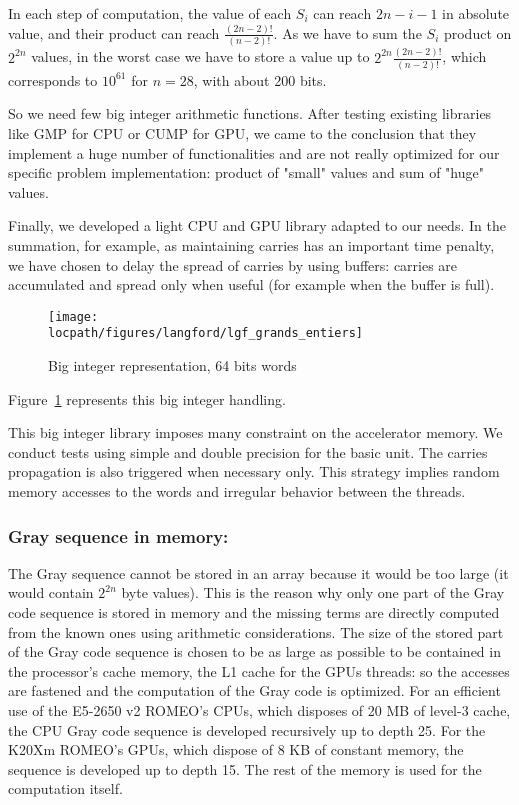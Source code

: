 In each step of computation, the value of each $S_i$ can reach $2n-i-1$ in absolute value, and their product can reach $\frac{(2n-2)!}{(n-2)!}$. 
As we have to sum the $S_i$ product on $2^{2n}$ values, in the worst case we have to store a value up to $2^{2n}\frac{(2n-2)!}{(n-2)!}$, which corresponds to $10^{61}$ for $n=28$, with about 200 bits.

So we need few big integer arithmetic functions. After testing existing libraries like GMP for CPU or CUMP for GPU, we came to the conclusion that they implement a huge number of functionalities and are not really optimized for our specific problem implementation: product of "small" values and sum of "huge" values. 

Finally, we developed a light CPU and GPU library adapted to our needs.
In the summation, for example, as maintaining carries has an important time penalty, we have chosen to delay the spread of carries by using buffers: carries are accumulated and spread only when useful (for example when the buffer is full).
\begin{figure}[t!]
\centering
\texttt{[image: \\locpath/figures/langford/lgf\_grands\_entiers]}
\caption{Big integer representation, 64 bits words}
\label{fig:big-integer}
\end{figure}
Figure~\ref{fig:big-integer} represents this big integer handling.

This big integer library imposes many constraint on the accelerator memory. 
We conduct tests using simple and double precision for the basic unit. 
The carries propagation is also triggered when necessary only. 
This strategy implies random memory accesses to the words and irregular behavior between the threads. 

\subsubsection{Gray sequence in memory: }
The Gray sequence cannot be stored in an array because it would be too large (it would contain $2^{2n}$ byte values). This is the reason why only one part of the Gray code sequence is stored in memory and the missing terms are directly computed from the known ones using arithmetic considerations.
The size of the stored part of the Gray code sequence is chosen to be as large as possible to be contained in the processor's cache memory, the L1 cache for the GPUs threads: so the accesses are fastened and the computation of the Gray code is optimized.
For an efficient use of the E5-2650 v2 ROMEO's CPUs, which disposes of 20 MB of level-3 cache, the CPU Gray code sequence is developed recursively up to depth 25. For the K20Xm ROMEO's GPUs, which dispose of 8 KB of constant memory, the sequence is developed up to depth 15. The rest of the memory is used for the computation itself. 

